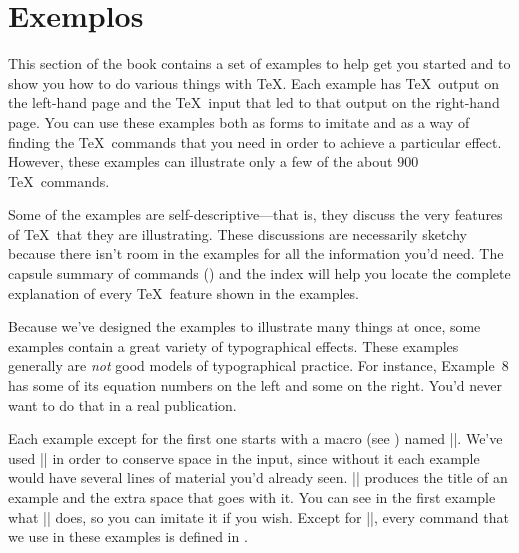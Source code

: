 

\chapter{Exemplos}


This section of the book contains a set of examples 
to help get you started and to show you how to do various things with \TeX.
Each example has \TeX\ output on the left-hand page and the \TeX \
input that led to that output on the right-hand page.
You can use these examples both as forms to imitate and
as a way of finding the
\TeX\ commands that you need in order to achieve a particular effect.
However, these examples can illustrate only a few of the
about $900$ \TeX\ commands.

Some of the examples are self-descriptive---that is, they discuss the very
features of \TeX\ that they are illustrating.  These discussions are
necessarily sketchy because there isn't room in the examples for all the
information you'd need.  The capsule summary of commands
()
and the index will help you
locate the complete explanation of every \TeX\ feature shown in the
examples.

Because we've designed the examples to illustrate 
many things at once, some examples contain a great variety of
typographical effects.  These examples generally are \emph{not} good
models of typographical practice.  For instance, Example~8 has some of its
equation numbers on the left and some on the right.  You'd never want to
do that in a real publication.

Each example except for the first one starts with a macro (see 
) named |\xmpheader|.  We've used |\xmpheader| in order to
conserve space in the input, since without it each example would have
several lines of material you'd already seen.
|\xmpheader| produces the title of an example and the
extra space that goes with it.  You can see in the first example 
what |\xmpheader| does, so you can imitate it if you wish.
Except for |\xmpheader|, every command that we use in these examples is
defined in \plainTeX.

{%
   \let\bye = \relax %
   \doexamples {xmptext}%
}%


\endchapter
\byebye
